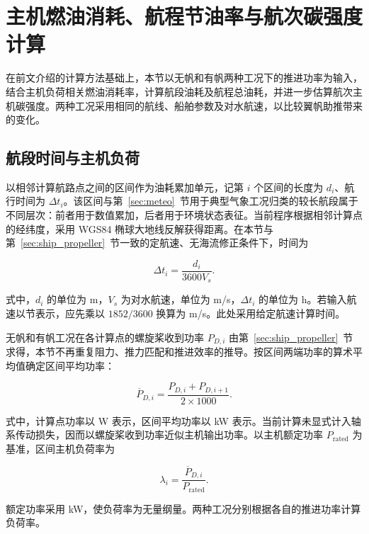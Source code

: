 \documentclass[UTF8,a4paper,twoside,zihao=5,fontset=windows]{ctexart}
\begin{document}
\section{主机燃油消耗、航程节油率与航次碳强度计算}
\label{sec:fuel-cii}

在前文介绍的计算方法基础上，本节以无帆和有帆两种工况下的推进功率为输入，结合主机负荷相关燃油消耗率，计算航段油耗及航程总油耗，并进一步估算航次主机碳强度。两种工况采用相同的航线、船舶参数及对水航速，以比较翼帆助推带来的变化。

\subsection{航段时间与主机负荷}

以相邻计算航路点之间的区间作为油耗累加单元，记第 $i$ 个区间的长度为 $d_i$、航行时间为 $\Delta t_i$。该区间与第~\ref{sec:meteo}~节用于典型气象工况归类的较长航段属于不同层次：前者用于数值累加，后者用于环境状态表征。当前程序根据相邻计算点的经纬度，采用 WGS84 椭球大地线反解获得距离。在本节与第~\ref{sec:ship_propeller}~节一致的定航速、无海流修正条件下，时间为

\begin{equation}
\Delta t_i=\frac{d_i}{3600V_s}.
\label{eq:fuel-cii-1}
\end{equation}

式中，$d_i$ 的单位为 m，$V_s$ 为对水航速，单位为 m/s，$\Delta t_i$ 的单位为 h。若输入航速以节表示，应先乘以 $1852/3600$ 换算为 m/s。此处采用给定航速计算时间。

无帆和有帆工况在各计算点的螺旋桨收到功率 $P_{D,i}$ 由第~\ref{sec:ship_propeller}~节求得，本节不再重复阻力、推力匹配和推进效率的推导。按区间两端功率的算术平均值确定区间平均功率：

\begin{equation}
\overline{P}_{D,i}=\frac{P_{D,i}+P_{D,i+1}}{2\times1000}.
\label{eq:fuel-cii-2}
\end{equation}

式中，计算点功率以 W 表示，区间平均功率以 kW 表示。当前计算未显式计入轴系传动损失，因而以螺旋桨收到功率近似主机输出功率。以主机额定功率 $P_{\mathrm{rated}}$ 为基准，区间主机负荷率为

\begin{equation}
\lambda_i=\frac{\overline{P}_{D,i}}{P_{\mathrm{rated}}}.
\label{eq:fuel-cii-3}
\end{equation}

额定功率采用 kW，使负荷率为无量纲量。两种工况分别根据各自的推进功率计算负荷率。
\end{document}
